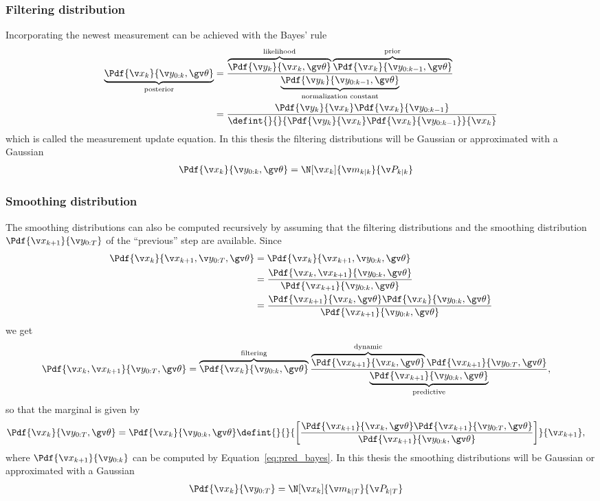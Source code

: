\subsubsection*{Filtering distribution}
Incorporating the newest measurement can be achieved with the Bayes'
rule \parencite[see,e.g.,][]{gelman2004}
\begin{align}
	\underbrace{\Pdf{\xk}{\y_{0:k},\Th}}_\text{posterior}&=\frac{\overbrace{\Pdf{\yk}{\xk,\Th}}^\text{likelihood}\overbrace{\Pdf{\xk}{\y_{0:k-1},\Th}}^\text{prior}}{\underbrace{\Pdf{\y_{k}}{\y_{0:k-1},\Th}}_\text{normalization
	constant}}\nonumber\\
	&=\frac{\Pdf{\yk}{\xk}\Pdf{\xk}{\y_{0:k-1}}}{\defint{}{}{\Pdf{\yk}{\xk}\Pdf{\xk}{\y_{0:k-1}}}{\xk}}
	\label{eq:filt_bayes}
\end{align}
which is called the measurement update equation.
In this thesis the filtering distributions will be Gaussian or approximated with a Gaussian
\begin{align}
	\Pdf{\xk}{\y_{0:k},\Th}&=\N[\xk]{\m_{k|k}}{\P_{k|k}}
\end{align}


\subsubsection*{Smoothing distribution}
The smoothing distributions can also be computed recursively by assuming that the filtering distributions
and the smoothing distribution $\Pdf{\x_{k+1}}{\Y}$ of the ``previous'' step are available.
Since
\begin{align*}
	\Pdf{\xk}{\x_{k+1},\Y,\Th}&=\Pdf{\xk}{\x_{k+1},\y_{0:k},\Th}\\
	&=\frac{\Pdf{\xk,\x_{k+1}}{\y_{0:k},\Th}}{\Pdf{\x_{k+1}}{\y_{0:k},\Th}}\\
	&=\frac{\Pdf{\x_{k+1}}{\xk,\Th}\Pdf{\xk}{\y_{0:k},\Th}}{\Pdf{\x_{k+1}}{\y_{0:k},\Th}}
\end{align*}
we get
\begin{align}
	\Pdf{\xk,\x_{k+1}}{\Y,\Th}&=\overbrace{\Pdf{\xk}{\y_{0:k},\Th}}^\text{filtering}\frac{\overbrace{\Pdf{\x_{k+1}}{\xk,\Th}}^\text{dynamic}\Pdf{\x_{k+1}}{\y_{0:T},\Th}}{\underbrace{\Pdf{\x_{k+1}}{\y_{0:k},\Th}}_\text{predictive}},
	\label{eq:smooth_joint_bayes}
\end{align}
so that the marginal is given by
\begin{align}
	\Pdf{\xk}{\Y,\Th}&=\Pdf{\xk}{\y_{0:k},\Th}\defint{}{}{\left[\frac{\Pdf{\x_{k+1}}{\xk,\Th}\Pdf{\x_{k+1}}{\Y,\Th}}{\Pdf{\x_{k+1}}{\y_{0:k},\Th}}\right]}{\x_{k+1}},
	\label{eq:smooth_bayes}
\end{align}
where $\Pdf{\x_{k+1}}{\y_{0:k}}$ can be computed by Equation~\eqref{eq:pred_bayes}.
In this thesis the smoothing distributions will be Gaussian or approximated with a Gaussian
\begin{align}
	\Pdf{\xk}{\Y}&=\N[\xk]{\m_{k|T}}{\P_{k|T}}
	\label{eq:smoothing_gaussian}
\end{align}

